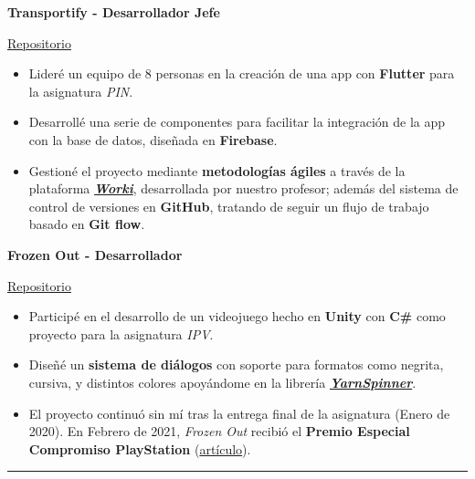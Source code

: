 \documentclass[letterpaper, 12pt, dvipsnames]{article}
\begin{document}
\begin{center}
    \large{\textbf{Transportify - Desarrollador Jefe}}\par
    \vspace{.2em}
    \href{https://github.com/Mobility-Solutions/Transportify}{Repositorio}
\end{center}
\begin{itemize}
    \item Lideré un equipo de 8 personas en la creación de una app con \textbf{Flutter} para la asignatura \emph{PIN}.
    \item Desarrollé una serie de componentes para facilitar la integración de la app con la base de datos, diseñada en \textbf{Firebase}.
    \item Gestioné el proyecto mediante \textbf{metodologías ágiles} a través de la plataforma \href{http://www.tuneupprocess.com/}{\textbf{\emph{Worki}}}, desarrollada por nuestro profesor; además del sistema de control de versiones en \textbf{GitHub}, tratando de seguir un flujo de trabajo basado en \textbf{Git flow}.
\end{itemize}
\vspace{1em}
\begin{center}
    \large{\textbf{Frozen Out - Desarrollador}}\par
    \vspace{.2em}
    \href{https://github.com/Mobility-Solutions/Transportify}{Repositorio}
\end{center}
\begin{itemize}
    \item Participé en el desarrollo de un videojuego hecho en \textbf{Unity} con \textbf{C\#} como proyecto para la asignatura \emph{IPV}.
    \item Diseñé un \textbf{sistema de diálogos} con soporte para formatos como negrita, cursiva, y distintos colores apoyándome en la librería \href{https://yarnspinner.dev/}{\textbf{\emph{YarnSpinner}}}.
    \item El proyecto continuó sin mí tras la entrega final de la asignatura (Enero de 2020). En Febrero de 2021, \emph{Frozen Out} recibió el \textbf{Premio Especial Compromiso PlayStation} (\href{https://www.inf.upv.es/www/etsinf/es/premio-especial-compromiso-playstation-para-el-videojuego-frozen-out-creado-por-estudiantes-de-la-etsinf-y-la-facultat-de-bb-aa/}{artículo}).
\end{itemize}
\rule{\textwidth}{.4pt}

\pagebreak
\end{document}
